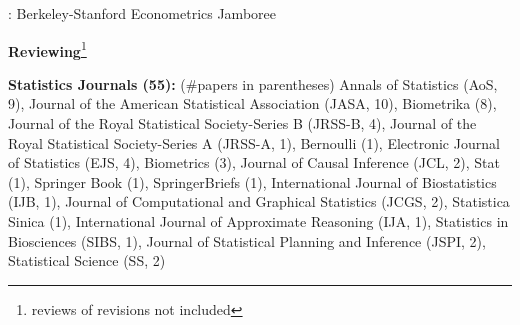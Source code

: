 \documentclass{article}
\begin{document}
\vspace{4mm}
: Berkeley-Stanford Econometrics Jamboree
 











\vspace{7mm}
\begin{large}
\noindent \textbf{Reviewing}\footnote{reviews of revisions not included}
\end{large}

\vspace{2mm}
\noindent \textbf{Statistics Journals (55): }(\#papers in parentheses) Annals of Statistics (AoS, 9), Journal of the American Statistical Association (JASA, 10), Biometrika (8), Journal of the Royal Statistical Society-Series B (JRSS-B, 4), Journal of the Royal Statistical Society-Series A (JRSS-A, 1), Bernoulli (1), Electronic Journal of Statistics (EJS, 4), Biometrics (3), Journal of Causal Inference (JCL, 2), Stat (1), Springer Book (1), SpringerBriefs (1), International Journal of Biostatistics (IJB, 1), Journal of Computational and Graphical Statistics (JCGS, 2), Statistica Sinica (1), International Journal of Approximate Reasoning (IJA, 1), Statistics in Biosciences (SIBS, 1), Journal of Statistical Planning and Inference (JSPI, 2), Statistical Science (SS, 2)
\end{document}
